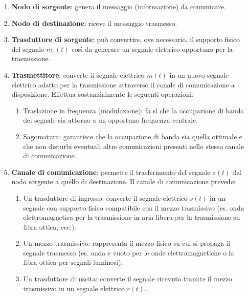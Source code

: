 \begin{enumerate}
    \item \textbf{Nodo di sorgente}: genera il messaggio (informazione) da comunicare.
    \item \textbf{Nodo di destinazione}: riceve il messaggio trasmesso.
    \item \textbf{Trasduttore di sorgente}: può convertire, ove necessario, il supporto fisico del segnale $m_s(t)$ così da generare un segnale elettrico opportuno per la trasmissione.



    \item \textbf{Trasmettitore}: converte il segnale elettrico \( m(t) \) in un nuovo segnale elettrico adatto per la trasmissione attraverso il canale di comunicazione a disposizione. Effettua sostanzialmente le seguenti operazioni:
          \begin{enumerate}
              \item Traslazione in frequenza (modulazione): fa sì che la occupazione di banda del segnale sia attorno a un opportuna frequenza centrale.
              \item Sagomatura: garantisce che la occupazione di banda sia quella ottimale e che non disturbi eventuali altre comunicazioni presenti nello stesso canale di comunicazione.
          \end{enumerate}

    \item \textbf{Canale di comunicazione}: permette il trasferimento del segnale \( s(t) \) dal nodo sorgente a quello di destinazione. Il canale di comunicazione prevede:
          \begin{enumerate}
              \item Un trasduttore di ingresso: converte il segnale elettrico \( s(t) \) in un segnale con supporto fisico compatibile con il mezzo trasmissivo (es. onda elettromagnetica per la trasmissione in aria libera per la trasmissione su fibra ottica, ecc.).
              \item Un mezzo trasmissivo: rappresenta il mezzo fisico su cui si propaga il segnale trasmesso (es. onda e vuoto per le onde elettromagnetiche o la fibra ottica per segnali luminosi).
              \item Un trasduttore di uscita: converte il segnale ricevuto tramite il mezzo trasmissivo in un segnale elettrico \( r(t) \).
          \end{enumerate}


\end{enumerate}
